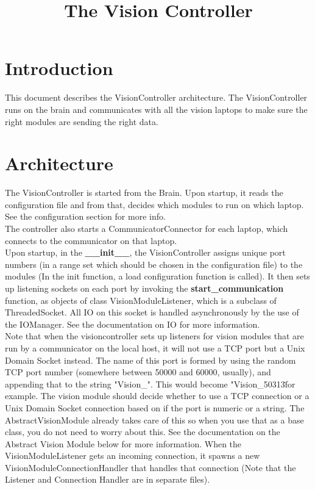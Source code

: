 \documentclass[a4paper, 10pt, oneside]{article}
\title{The Vision Controller}
\begin{document}
\maketitle

\lstset{ 
    basicstyle=\footnotesize,  
}

\section{Introduction}
This document describes the VisionController architecture. The VisionController
runs on the brain and communicates with all the vision laptops to make sure the
right modules are sending the right data. \\

\section{Architecture}
The VisionController is started from the Brain. Upon startup, it reads the
configuration file and from that, decides which modules to run on which laptop.
See the configuration section for more info. \\

The controller also starts a CommunicatorConnector for each laptop, which
connects to the communicator on that laptop. \\

Upon startup, in the \textbf{\_\_init\_\_}, the VisionController assigns unique
port numbers (in a range set which should be chosen in the configuration file)
to the modules (In the init function, a load configuration function is called).
It then sets up listening sockets on each port by invoking the
\textbf{start\_communication} function, as objects of class
VisionModuleListener, which is a subclass of ThreadedSocket. All IO on this
socket is handled asynchronously by the use of the IOManager. See the
documentation on IO for more information. \\

Note that when the visioncontroller sets up listeners for vision modules that
are run by a communicator on the local host, it will not use a TCP port but a
Unix Domain Socket instead. The name of this port is formed by using the random
TCP port number (somewhere between 50000 and 60000, usually), and appending that
to the string "Vision\_". This would become "Vision\_50313\" for example. The
vision module should decide whether to use a TCP connection or a Unix Domain
Socket connection based on if the port is numeric or a string. The
AbstractVisionModule already takes care of this so when you use that as a base
class, you do not need to worry about this. See the documentation on the
Abstract Vision Module below for more information. When the VisionModuleListener
gets an incoming connection, it spawns a new VisionModuleConnectionHandler that
handles that connection (Note that the Listener and Connection Handler are in
separate files). \\
\end{document}

